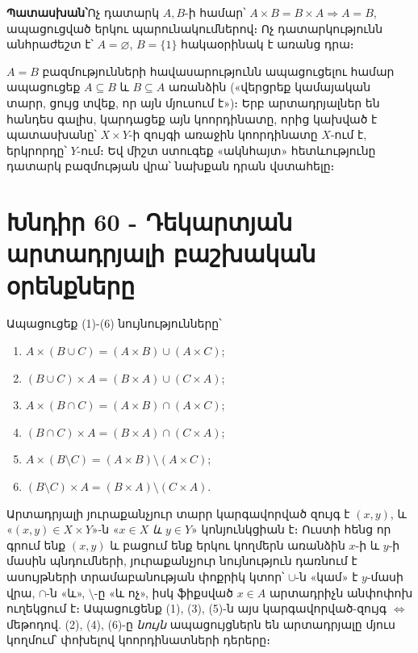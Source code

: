 \documentclass[11pt,a4paper]{article}
\newcommand{\answer}[1]{\begin{answerbox}\centering\textbf{Պատասխան՝}\quad #1\end{answerbox}}
\begin{document}
\answer{Ոչ դատարկ $A,B$-ի համար՝ $A\times B=B\times A\Rightarrow A=B$, ապացուցված երկու պարունակումներով։
Ոչ դատարկությունն անհրաժեշտ է՝ $A=\varnothing$, $B=\{1\}$ հակաօրինակ է առանց դրա։}

\begin{methodbox}
$A=B$ բազմությունների հավասարությունն ապացուցելու համար ապացուցեք
$A\subseteq B$ և $B\subseteq A$ առանձին («վերցրեք կամայական տարր, ցույց տվեք, որ այն մյուսում է»)։ Երբ
արտադրյալներ են հանդես գալիս, կարդացեք այն կոորդինատը, որից կախված է պատասխանը՝ $X\times Y$-ի զույգի առաջին
կոորդինատը $X$-ում է, երկրորդը՝ $Y$-ում։ Եվ միշտ ստուգեք «ակնհայտ» հետևությունը դատարկ բազմության վրա՝
նախքան դրան վստահելը։
\end{methodbox}

\section*{Խնդիր 60 - Դեկարտյան արտադրյալի բաշխական օրենքները}

\begin{problembox}[60]
Ապացուցեք (1)-(6) նույնությունները՝
\begin{enumerate}[label=\textbf{(\arabic*)},leftmargin=1.4cm,itemsep=1pt]
\item $A\times(B\cup C)=(A\times B)\cup(A\times C)$;
\item $(B\cup C)\times A=(B\times A)\cup(C\times A)$;
\item $A\times(B\cap C)=(A\times B)\cap(A\times C)$;
\item $(B\cap C)\times A=(B\times A)\cap(C\times A)$;
\item $A\times(B\setminus C)=(A\times B)\setminus(A\times C)$;
\item $(B\setminus C)\times A=(B\times A)\setminus(C\times A)$.
\end{enumerate}
\end{problembox}

\begin{ideabox}
Արտադրյալի յուրաքանչյուր տարր կարգավորված զույգ է $(x,y)$, և «$(x,y)\in X\times Y$»-ն
«$x\in X$ \emph{և} $y\in Y$» կոնյունկցիան է։ Ուստի հենց որ գրում ենք $(x,y)$ և բացում ենք երկու կողմերն
առանձին $x$-ի և $y$-ի մասին պնդումների, յուրաքանչյուր նույնություն դառնում է ասույթների տրամաբանության
փոքրիկ կտոր՝ $\cup$-ն «կամ» է $y$-մասի վրա, $\cap$-ն «և», $\setminus$-ը «և ոչ», իսկ ֆիքսված $x\in A$
արտադրիչն անփոփոխ ուղեկցում է։ Ապացուցենք (1), (3), (5)-ն այս կարգավորված-զույգ ${\iff}$
մեթոդով. (2), (4), (6)-ը \emph{նույն} ապացույցներն են արտադրյալը մյուս կողմում՝ փոխելով կոորդինատների
դերերը։
\end{ideabox}
\end{document}
